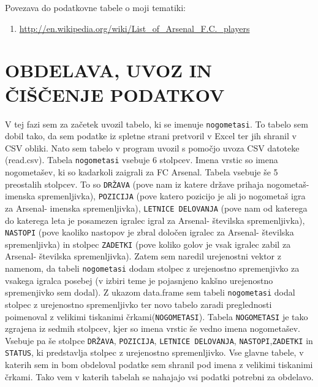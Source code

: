 \documentclass[11pt,a4paper]{article}
\begin{document}
Povezava do podatkovne tabele o moji tematiki: 
\begin{enumerate}
\item{\url{http://en.wikipedia.org/wiki/List_of_Arsenal_F.C._players}}
\end{enumerate}

\section{OBDELAVA, UVOZ IN ČIŠČENJE PODATKOV}

V tej fazi sem za začetek uvozil tabelo, ki se imenuje \verb|nogometasi|. To tabelo sem dobil tako, da sem podatke iz spletne strani pretvoril v Excel ter jih shranil v CSV obliki. Nato sem tabelo v program uvozil s pomočjo uvoza CSV datoteke (read.csv). Tabela \verb|nogometasi| vsebuje 6 stolpcev. Imena vrstic so imena nogometašev, ki so kadarkoli zaigrali za FC Arsenal. Tabela vsebuje še 5 preostalih stolpcev. To so \verb|DRŽAVA| (pove nam iz katere države prihaja nogometaš- imenska spremenljivka), \verb|POZICIJA| (pove katero pozicijo je ali jo nogometaš igra za Arsenal- imenska spremenljivka), \verb|LETNICE DELOVANJA| (pove nam od katerega do katerega leta je posamezen igralec igral za Arsenal- številska spremenljivka), \verb|NASTOPI| (pove kaoliko nastopov je zbral določen igralec za Arsenal- številska spremenljivka) in stolpec \verb|ZADETKI| (pove koliko golov je vsak igralec zabil za Arsenal- številska spremenljivka). Zatem sem naredil urejenostni vektor z namenom, da tabeli \verb|nogometasi| dodam stolpec z urejenostno spremenjivko za vsakega igralca posebej (v izbiri teme je pojasnjeno kakšno urejenostno spremenjivko sem dodal). Z ukazom data.frame sem tabeli \verb|nogometasi| dodal stolpec z urejenostno spremenljivko ter novo tabelo zaradi preglednosti poimenoval z velikimi tiskanimi črkami(\verb|NOGOMETASI|). Tabela \verb|NOGOMETASI| je tako zgrajena iz sedmih stolpcev, kjer so imena vrstic še vedno imena nogometašev. Vsebuje pa še stolpce \verb|DRŽAVA|, \verb|POZICIJA|, \verb|LETNICE DELOVANJA|, \verb|NASTOPI|,\verb|ZADETKI| in \verb|STATUS|, ki predstavlja stolpec z urejenostno spremenljivko. Vse glavne tabele, v katerih sem in bom obdeloval podatke sem shranil pod imena z velikimi tiskanimi črkami. Tako vem v katerih tabelah se nahajajo vsi podatki potrebni za obdelavo.
\end{document}
